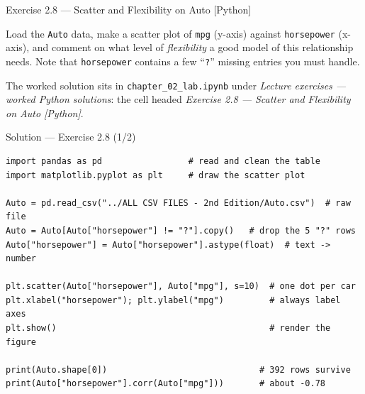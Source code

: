 \documentclass[aspectratio=169,11pt]{beamer}
\begin{document}
\begin{frame}{Exercise 2.8 --- Scatter and Flexibility on Auto [Python]}
\begin{exercise}
Load the \texttt{Auto} data, make a scatter plot of \texttt{mpg}
(y-axis) against \texttt{horsepower} (x-axis), and comment on what
level of \emph{flexibility} a good model of this relationship needs.
Note that \texttt{horsepower} contains a few ``\texttt{?}'' missing
entries you must handle.
\end{exercise}
\begin{labnote}
  The worked solution sits in \texttt{chapter\_02\_lab.ipynb} under
  \emph{Lecture exercises --- worked Python solutions}: the cell headed
  \emph{Exercise 2.8 --- Scatter and Flexibility on Auto [Python]}.
\end{labnote}
\end{frame}

\begin{frame}[fragile]{Solution --- Exercise 2.8 (1/2)}
\begin{solutionbox}
\begin{lstlisting}
import pandas as pd                 # read and clean the table
import matplotlib.pyplot as plt     # draw the scatter plot

Auto = pd.read_csv("../ALL CSV FILES - 2nd Edition/Auto.csv")  # raw file
Auto = Auto[Auto["horsepower"] != "?"].copy()   # drop the 5 "?" rows
Auto["horsepower"] = Auto["horsepower"].astype(float)  # text -> number

plt.scatter(Auto["horsepower"], Auto["mpg"], s=10)  # one dot per car
plt.xlabel("horsepower"); plt.ylabel("mpg")         # always label axes
plt.show()                                          # render the figure

print(Auto.shape[0])                              # 392 rows survive
print(Auto["horsepower"].corr(Auto["mpg"]))       # about -0.78
\end{lstlisting}
\end{solutionbox}
\end{frame}
\end{document}
